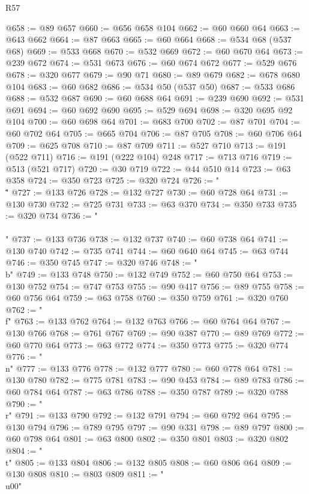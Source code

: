 \begin{lexlean}{R57}
\begin{coremodule}
@658 := @89 @657
@660 := @656 @658 @104
@662 := @60 @660 @64
@663 := @643 @662
@664 := @87 @663
@665 := @60 @664
@668 := @534 @68 (@537 @68)
@669 := @533 @668
@670 := @532 @669
@672 := @60 @670 @64
@673 := @239 @672
@674 := @531 @673
@676 := @60 @674 @672
@677 := @529 @676
@678 := @320 @677
@679 := @90 @71
@680 := @89 @679
@682 := @678 @680 @104
@683 := @60 @682
@686 := @534 @50 (@537 @50)
@687 := @533 @686
@688 := @532 @687
@690 := @60 @688 @64
@691 := @239 @690
@692 := @531 @691
@694 := @60 @692 @690
@695 := @529 @694
@698 := @320 @695 @92 @104
@700 := @60 @698 @64
@701 := @683 @700
@702 := @87 @701
@704 := @60 @702 @64
@705 := @665 @704
@706 := @87 @705
@708 := @60 @706 @64
@709 := @625 @708
@710 := @87 @709
@711 := @527 @710
@713 := @191 (@522 @711)
@716 := @191 (@222 @104) @248
@717 := @713 @716
@719 := @513 (@521 @717)
@720 := @30 @719
@722 := @44 @510 @14
@723 := @63 @358
@724 := @350 @723
@725 := @320 @724
@726 := "\\\""
@727 := @133 @726
@728 := @132 @727
@730 := @60 @728 @64
@731 := @130 @730
@732 := @725 @731
@733 := @63 @370
@734 := @350 @733
@735 := @320 @734
@736 := "\\\\"
@737 := @133 @736
@738 := @132 @737
@740 := @60 @738 @64
@741 := @130 @740
@742 := @735 @741
@744 := @60 @640 @64
@745 := @63 @744
@746 := @350 @745
@747 := @320 @746
@748 := "\\b"
@749 := @133 @748
@750 := @132 @749
@752 := @60 @750 @64
@753 := @130 @752
@754 := @747 @753
@755 := @90 @417
@756 := @89 @755
@758 := @60 @756 @64
@759 := @63 @758
@760 := @350 @759
@761 := @320 @760
@762 := "\\f"
@763 := @133 @762
@764 := @132 @763
@766 := @60 @764 @64
@767 := @130 @766
@768 := @761 @767
@769 := @90 @387
@770 := @89 @769
@772 := @60 @770 @64
@773 := @63 @772
@774 := @350 @773
@775 := @320 @774
@776 := "\\n"
@777 := @133 @776
@778 := @132 @777
@780 := @60 @778 @64
@781 := @130 @780
@782 := @775 @781
@783 := @90 @453
@784 := @89 @783
@786 := @60 @784 @64
@787 := @63 @786
@788 := @350 @787
@789 := @320 @788
@790 := "\\r"
@791 := @133 @790
@792 := @132 @791
@794 := @60 @792 @64
@795 := @130 @794
@796 := @789 @795
@797 := @90 @331
@798 := @89 @797
@800 := @60 @798 @64
@801 := @63 @800
@802 := @350 @801
@803 := @320 @802
@804 := "\\t"
@805 := @133 @804
@806 := @132 @805
@808 := @60 @806 @64
@809 := @130 @808
@810 := @803 @809
@811 := "\\u00"

\end{coremodule}
\end{lexlean}
